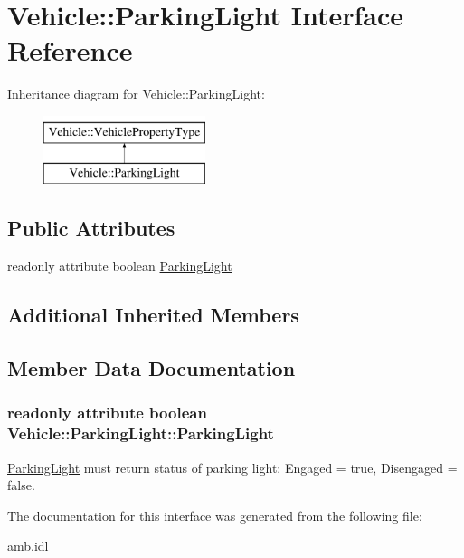 \hypertarget{interfaceVehicle_1_1ParkingLight}{\section{Vehicle\-:\-:Parking\-Light Interface Reference}
\label{interfaceVehicle_1_1ParkingLight}
}
Inheritance diagram for Vehicle\-:\-:Parking\-Light\-:\begin{figure}[H]
\begin{center}
\leavevmode
\includegraphics[height=2.000000cm]{interfaceVehicle_1_1ParkingLight}
\end{center}
\end{figure}
\subsection*{Public Attributes}
\begin{DoxyCompactItemize}
\item 
readonly attribute boolean \hyperlink{interfaceVehicle_1_1ParkingLight_af6eb560f82f8643c25e5aea8cc09b637}{Parking\-Light}
\end{DoxyCompactItemize}
\subsection*{Additional Inherited Members}


\subsection{Member Data Documentation}
\hypertarget{interfaceVehicle_1_1ParkingLight_af6eb560f82f8643c25e5aea8cc09b637}{
\subsubsection[{Parking\-Light}]{\setlength{\rightskip}{0pt plus 5cm}readonly attribute boolean Vehicle\-::\-Parking\-Light\-::\-Parking\-Light}}\label{interfaceVehicle_1_1ParkingLight_af6eb560f82f8643c25e5aea8cc09b637}
\hyperlink{interfaceVehicle_1_1ParkingLight}{Parking\-Light} must return status of parking light\-: Engaged = true, Disengaged = false. 

The documentation for this interface was generated from the following file\-:\begin{DoxyCompactItemize}
\item 
amb.\-idl\end{DoxyCompactItemize}
